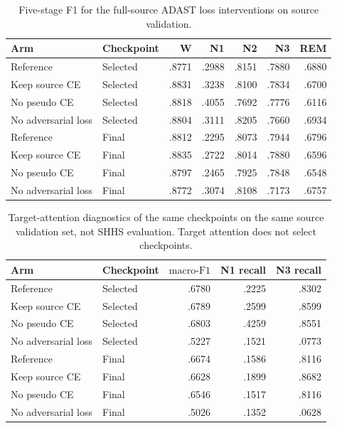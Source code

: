 \documentclass[10pt,a4paper]{article}
\newcommand{\mf}{\ensuremath{\mathrm{macro\text{-}F1}}}
\begin{document}
\begin{table}[H]
\centering\small
\caption{Five-stage F1 for the full-source ADAST loss interventions on source validation.}
\label{tab:sup_adast_loss_allclass}
\begin{tabular}{llrrrrr}
\toprule
Arm & Checkpoint & W & N1 & N2 & N3 & REM \\
\midrule
Reference & Selected & .8771 & .2988 & .8151 & .7880 & .6880 \\
Keep source CE & Selected & .8831 & .3238 & .8100 & .7834 & .6700 \\
No pseudo CE & Selected & .8818 & .4055 & .7692 & .7776 & .6116 \\
No adversarial loss & Selected & .8804 & .3111 & .8205 & .7660 & .6934 \\
\midrule
Reference & Final & .8812 & .2295 & .8073 & .7944 & .6796 \\
Keep source CE & Final & .8835 & .2722 & .8014 & .7880 & .6596 \\
No pseudo CE & Final & .8797 & .2465 & .7925 & .7848 & .6548 \\
No adversarial loss & Final & .8772 & .3074 & .8108 & .7173 & .6757 \\
\bottomrule
\end{tabular}
\end{table}

\begin{table}[H]
\centering\small
\caption{Target-attention diagnostics of the same checkpoints on the same source validation
set, not SHHS evaluation. Target attention does not select checkpoints.}
\label{tab:sup_adast_loss_attention}
\begin{tabular}{llrrr}
\toprule
Arm & Checkpoint & \mf & N1 recall & N3 recall \\
\midrule
Reference & Selected & .6780 & .2225 & .8302 \\
Keep source CE & Selected & .6789 & .2599 & .8599 \\
No pseudo CE & Selected & .6803 & .4259 & .8551 \\
No adversarial loss & Selected & .5227 & .1521 & .0773 \\
\midrule
Reference & Final & .6674 & .1586 & .8116 \\
Keep source CE & Final & .6628 & .1899 & .8682 \\
No pseudo CE & Final & .6546 & .1517 & .8116 \\
No adversarial loss & Final & .5026 & .1352 & .0628 \\
\bottomrule
\end{tabular}
\end{table}
\end{document}
